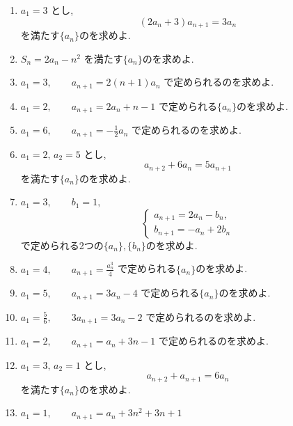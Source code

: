 \begin{enumerate}[label=\textbf{問\arabic*.},leftmargin=3.8em,format=\bookitemlink{practice-basic}{problem}{hint}]
  \item $a_1=3$ とし,
    \[
      (2a_n+3)a_{n+1}=3a_n
    \]
    を満たす$\{a_n\}$のを求めよ.
  \item $S_n=2a_n-n^2$
    を満たす$\{a_n\}$のを求めよ.
  \item $a_1=3,\qquad a_{n+1}=2(n+1)a_n$
    で定められるのを求めよ.
  \item $a_1=2,\qquad a_{n+1}=2a_n+n-1$
    で定められる$\{a_n\}$のを求めよ.
  \item $a_1=6,\qquad a_{n+1}=-\frac12a_n$
    で定められるのを求めよ.
  \item $a_1=2,\,a_2=5$ とし,
    \[
      a_{n+2}+6a_n=5a_{n+1}
    \]
    を満たす$\{a_n\}$のを求めよ.
  \item $a_1=3,\qquad b_1=1,$
    \[
      \begin{cases}
        a_{n+1}=2a_n-b_n,\\
        b_{n+1}=-a_n+2b_n
      \end{cases}
    \]
    で定められる2つの$\{a_n\},\{b_n\}$のを求めよ.
  \item $a_1=4,\qquad a_{n+1}=\frac{a_n^3}{4}$
    で定められる$\{a_n\}$のを求めよ.
  \item $a_1=5,\qquad a_{n+1}=3a_n-4$
    で定められる$\{a_n\}$のを求めよ.
  \item $a_1=\frac56,\qquad 3a_{n+1}=3a_n-2$
    で定められるのを求めよ.
  \item $a_1=2,\qquad a_{n+1}=a_n+3n-1$
    で定められるのを求めよ.
  \item $a_1=3,\,a_2=1$ とし,
    \[
      a_{n+2}+a_{n+1}=6a_n
    \]
    を満たす$\{a_n\}$のを求めよ.
  \item $a_1=1,\qquad a_{n+1}=a_n+3n^2+3n+1$

\end{enumerate}
